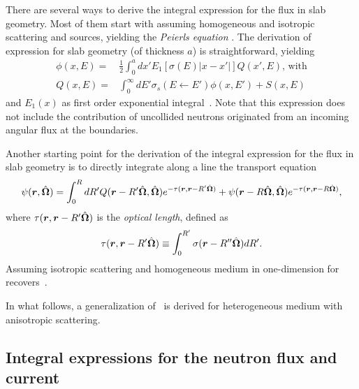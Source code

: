 There are several ways to derive the integral expression for the flux in slab geometry. Most of them start with assuming homogeneous and isotropic scattering and sources, yielding the \emph{Peierls equation} \cite{Davison-1957,Case-1967,Bell-1970,Pomraning-1973,Duderstadt-1979,Lewis-1984}. The derivation of expression for slab geometry (of thickness $a$) is straightforward, yielding
\begin{equation}\label{eq:flux-slab-l-0-no-bndry-terms}
\begin{split}
\phi(x,E)=&\frac{1}{2}\int_0^a { dx'
	E_1\left[\sigma(E)\lvert x-x'\rvert\right] Q(x',E)
} \text{, with} \\
Q(x,E) =& \int_0^\infty { dE'
		\sigma_s(E \leftarrow E')\phi(x,E') + S(x,E)
}
\end{split}
\end{equation}
and $E_1(x)$ as first order exponential integral~\cite{Abramowitz-1964}. Note that this expression does not include the contribution of uncollided neutrons originated from an incoming angular flux at the boundaries.

Another starting point for the derivation of the integral expression for the flux in slab geometry is to directly integrate along a line the transport equation~\cite{Davison-1957,Pomraning-1973,Duderstadt-1979,Lewis-1984}
\begin{equation}\label{eq:full-ITE-w-bndry-terms}
\psi(\bm{r},\hat{\bm{\Omega}}) = \int_0^R { dR'
	Q(\bm{r}-R'\hat{\bm{\Omega}},\hat{\bm{\Omega}}) e^{-\tau(\bm{r},\bm{r}-R'\hat{\bm{\Omega}})}
} + \psi(\bm{r}-R\hat{\bm{\Omega}},\hat{\bm{\Omega}}) e^{-\tau(\bm{r},\bm{r}-R\hat{\bm{\Omega}})},
\end{equation}
where $\tau(\bm{r},\bm{r}-R'\hat{\bm{\Omega}})$ is the \emph{optical length}, defined as
\begin{equation}\label{eq:opl}
\tau(\bm{r},\bm{r}-R'\hat{\bm{\Omega}}) \equiv \int_0^{R'} {\sigma(\bm{r}-R''\hat{\bm{\Omega}})dR'} .
\end{equation}
Assuming isotropic scattering and homogeneous medium in one-dimension for~ recovers~. 

In what follows, a generalization of~ is derived for heterogeneous medium with anisotropic scattering.  
%
\subsection{Integral expressions for the neutron flux and current}
\label{sec:int-flux-J}

